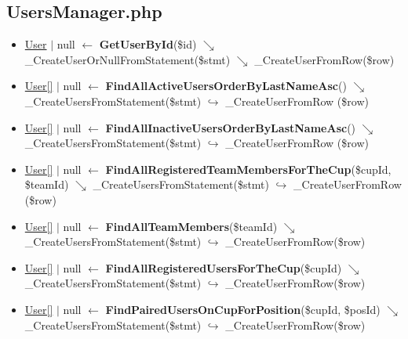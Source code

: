 \subsection{UsersManager.php}
\begin{itemize}
  \setlength\itemsep{0em}
  \item \underline{User} $\vert$ null $\leftarrow$ \textbf{GetUserById}(\$id)
  \newline    $\searrow$ \_CreateUserOrNullFromStatement(\$stmt)
  \newline    $\searrow$ \_CreateUserFromRow(\$row)
  \item \underline{User[]} $\vert$ null $\leftarrow$ \textbf{FindAllActiveUsersOrderByLastNameAsc}()
  \newline    $\searrow$ \_CreateUsersFromStatement(\$stmt)
  \newline    $\hookrightarrow$ \_CreateUserFromRow (\$row)
  \item \underline{User[]} $\vert$ null $\leftarrow$ \textbf{FindAllInactiveUsersOrderByLastNameAsc}()
  \newline    $\searrow$ \_CreateUsersFromStatement(\$stmt)
  \newline    $\hookrightarrow$ \_CreateUserFromRow (\$row)
  \item \underline{User[]} $\vert$ null $\leftarrow$ \textbf{FindAllRegisteredTeamMembersForTheCup}(\$cupId, \$teamId)
  \newline    $\searrow$ \_CreateUsersFromStatement(\$stmt)
  \newline    $\hookrightarrow$ \_CreateUserFromRow (\$row)
  \item \underline{User[]} $\vert$ null $\leftarrow$ \textbf{FindAllTeamMembers}(\$teamId)
  \newline    $\searrow$ \_CreateUsersFromStatement(\$stmt)
  \newline    $\hookrightarrow$ \_CreateUserFromRow(\$row)
  \item \underline{User[]} $\vert$ null $\leftarrow$ \textbf{FindAllRegisteredUsersForTheCup}(\$cupId)
  \newline    $\searrow$ \_CreateUsersFromStatement(\$stmt)
  \newline    $\hookrightarrow$ \_CreateUserFromRow(\$row)
  \item \underline{User[]} $\vert$ null $\leftarrow$ \textbf{FindPairedUsersOnCupForPosition}(\$cupId, \$posId)
  \newline    $\searrow$ \_CreateUsersFromStatement(\$stmt)
  \newline    $\hookrightarrow$ \_CreateUserFromRow(\$row)

\end{itemize}
